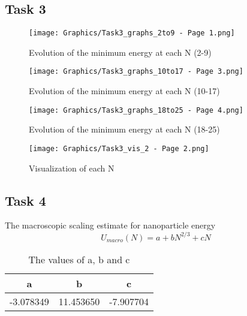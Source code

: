 \documentclass{scrartcl}
\begin{document}
    \subsection{Task 3}

    \begin{figure}[h!]
        \centering
        \texttt{[image: Graphics/Task3\_graphs\_2to9 - Page 1.png]}
        \caption{Evolution of the minimum energy at each N (2-9)}
        \label{fig:my_label 4}
    \end{figure}
    
\newpage

    \begin{figure}[h!]
        \centering
        \texttt{[image: Graphics/Task3\_graphs\_10to17 - Page 3.png]}
        \caption{Evolution of the minimum energy at each N (10-17)}
        \label{fig:my_label 4}
    \end{figure}

\newpage

    \begin{figure}[h!]
        \centering
        \texttt{[image: Graphics/Task3\_graphs\_18to25 - Page 4.png]}
        \caption{Evolution of the minimum energy at each N (18-25)}
        \label{fig:my_label 4}
    \end{figure}

    \begin{figure}[h!]
        \centering
        \texttt{[image: Graphics/Task3\_vis\_2 - Page 2.png]}
        \caption{Visualization of each N}
        \label{fig:my_label 5}
    \end{figure}

\newpage
    \subsection{Task 4}
    The macroscopic scaling estimate for nanoparticle energy
    \begin{equation}
        U_{macro}(N) = a + bN^{2/3} +cN
    \end{equation}

    \begin{table}[h!]
        \centering
        
        \begin{tabular}{|c|c|c|}
        \hline
           a  &  b  &  c\\
        \hline 
           -3.078349   & 11.453650 & -7.907704\\
        \hline
        \end{tabular}
        
        \caption{The values of a, b and c}
        \label{tab:table5}
    \end{table}
    
\end{document}
